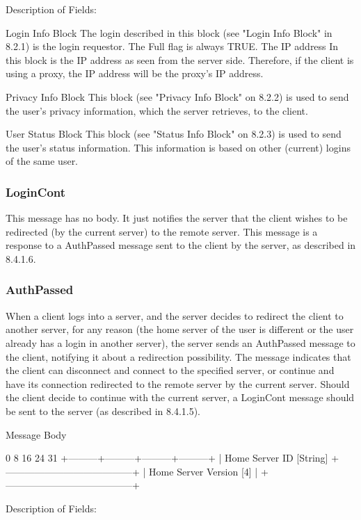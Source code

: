 \documentclass[titlepage,oneside]{book}
\begin{document}
Description of Fields:

Login Info Block
  The login described in this block (see "Login Info Block" in
  8.2.1) is the login requestor. The Full flag is always TRUE.
  The IP address
  In this block is the IP address as seen from the server side.
  Therefore, if the client is using a proxy, the IP address will be
  the proxy's IP address.

Privacy Info Block
  This block (see "Privacy Info Block" on 8.2.2) is used to
  send the user's privacy information, which the server retrieves, to
  the client.

User Status Block
  This block (see "Status Info Block" on 8.2.3) is used to
  send the user's status information. This information is based on
  other (current) logins of the same user.

\subsubsection{LoginCont}

This message has no body. It just notifies the server that the client
wishes to be redirected (by the current server) to the remote server.
This message is a response to a AuthPassed message sent to the client
by the server, as described in 8.4.1.6.

\subsubsection{AuthPassed}

When a client logs into a server, and the server decides to redirect
the client to another server, for any reason (the home server of the
user is different or the user already has a login in another server),
the server sends an AuthPassed message to the client, notifying it
about a redirection possibility. The message indicates that the client
can disconnect and connect to the specified server, or continue and
have its connection redirected to the remote server by the current
server. Should the client decide to continue with the current server, a
LoginCont message should be sent to the server (as described in
8.4.1.5).

Message Body

0         8         16        24      31
+---------+---------+---------+---------+
| Home Server ID [String]
+---------------------------------------+
|        Home Server Version [4]        |
+---------------------------------------+

Description of Fields:
\end{document}
